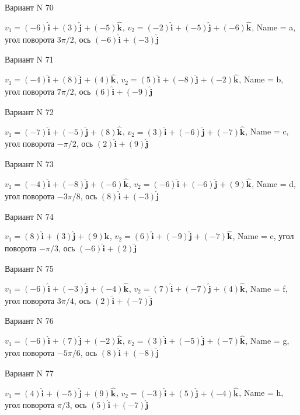 \documentclass[11pt]{report}
\begin{document}
Вариант N 70

$v_1 = (-6)\mathbf{\hat{i}_{}} + (3)\mathbf{\hat{j}_{}} + (-5)\mathbf{\hat{k}_{}}$, $v_2 = (-2)\mathbf{\hat{i}_{}} + (-5)\mathbf{\hat{j}_{}} + (-6)\mathbf{\hat{k}_{}}$, Name = a, угол поворота $3 \pi / 2$, ось $(-6)\mathbf{\hat{i}_{}} + (-3)\mathbf{\hat{j}_{}}$

Вариант N 71

$v_1 = (-4)\mathbf{\hat{i}_{}} + (8)\mathbf{\hat{j}_{}} + (4)\mathbf{\hat{k}_{}}$, $v_2 = (5)\mathbf{\hat{i}_{}} + (-8)\mathbf{\hat{j}_{}} + (-2)\mathbf{\hat{k}_{}}$, Name = b, угол поворота $7 \pi / 2$, ось $(6)\mathbf{\hat{i}_{}} + (-9)\mathbf{\hat{j}_{}}$

Вариант N 72

$v_1 = (-7)\mathbf{\hat{i}_{}} + (-5)\mathbf{\hat{j}_{}} + (8)\mathbf{\hat{k}_{}}$, $v_2 = (3)\mathbf{\hat{i}_{}} + (-6)\mathbf{\hat{j}_{}} + (-7)\mathbf{\hat{k}_{}}$, Name = c, угол поворота $- \pi / 2$, ось $(2)\mathbf{\hat{i}_{}} + (9)\mathbf{\hat{j}_{}}$

Вариант N 73

$v_1 = (-4)\mathbf{\hat{i}_{}} + (-8)\mathbf{\hat{j}_{}} + (-6)\mathbf{\hat{k}_{}}$, $v_2 = (-6)\mathbf{\hat{i}_{}} + (-6)\mathbf{\hat{j}_{}} + (9)\mathbf{\hat{k}_{}}$, Name = d, угол поворота $- 3 \pi / 8$, ось $(8)\mathbf{\hat{i}_{}} + (-3)\mathbf{\hat{j}_{}}$

Вариант N 74

$v_1 = (8)\mathbf{\hat{i}_{}} + (3)\mathbf{\hat{j}_{}} + (9)\mathbf{\hat{k}_{}}$, $v_2 = (6)\mathbf{\hat{i}_{}} + (-9)\mathbf{\hat{j}_{}} + (-7)\mathbf{\hat{k}_{}}$, Name = e, угол поворота $- \pi / 3$, ось $(-6)\mathbf{\hat{i}_{}} + (2)\mathbf{\hat{j}_{}}$

Вариант N 75

$v_1 = (-6)\mathbf{\hat{i}_{}} + (-3)\mathbf{\hat{j}_{}} + (-4)\mathbf{\hat{k}_{}}$, $v_2 = (7)\mathbf{\hat{i}_{}} + (-7)\mathbf{\hat{j}_{}} + (4)\mathbf{\hat{k}_{}}$, Name = f, угол поворота $3 \pi / 4$, ось $(2)\mathbf{\hat{i}_{}} + (-7)\mathbf{\hat{j}_{}}$

Вариант N 76

$v_1 = (-6)\mathbf{\hat{i}_{}} + (7)\mathbf{\hat{j}_{}} + (-2)\mathbf{\hat{k}_{}}$, $v_2 = (3)\mathbf{\hat{i}_{}} + (-5)\mathbf{\hat{j}_{}} + (-7)\mathbf{\hat{k}_{}}$, Name = g, угол поворота $- 5 \pi / 6$, ось $(8)\mathbf{\hat{i}_{}} + (-8)\mathbf{\hat{j}_{}}$

Вариант N 77

$v_1 = (4)\mathbf{\hat{i}_{}} + (-5)\mathbf{\hat{j}_{}} + (9)\mathbf{\hat{k}_{}}$, $v_2 = (-3)\mathbf{\hat{i}_{}} + (5)\mathbf{\hat{j}_{}} + (-4)\mathbf{\hat{k}_{}}$, Name = h, угол поворота $\pi / 3$, ось $(5)\mathbf{\hat{i}_{}} + (-7)\mathbf{\hat{j}_{}}$
\end{document}
